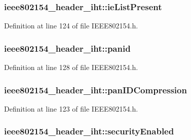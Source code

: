 \subsubsection[{\texorpdfstring{ie\+List\+Present}{ieListPresent}}]{ ieee802154\+\_\+header\+\_\+iht\+::ie\+List\+Present}\hypertarget{structieee802154__header__iht_a742bf0ac963d4dfef383f3874298572f}{}\label{structieee802154__header__iht_a742bf0ac963d4dfef383f3874298572f}


Definition at line 124 of file I\+E\+E\+E802154.\+h.

\subsubsection[{\texorpdfstring{panid}{panid}}]{ ieee802154\+\_\+header\+\_\+iht\+::panid}\hypertarget{structieee802154__header__iht_adb1dbee92649183063e5a8508b19fcb2}{}\label{structieee802154__header__iht_adb1dbee92649183063e5a8508b19fcb2}


Definition at line 128 of file I\+E\+E\+E802154.\+h.

\subsubsection[{\texorpdfstring{pan\+I\+D\+Compression}{panIDCompression}}]{ ieee802154\+\_\+header\+\_\+iht\+::pan\+I\+D\+Compression}\hypertarget{structieee802154__header__iht_a0e893eb7bc12f48410b7bfcdcfaf596c}{}\label{structieee802154__header__iht_a0e893eb7bc12f48410b7bfcdcfaf596c}


Definition at line 123 of file I\+E\+E\+E802154.\+h.

\subsubsection[{\texorpdfstring{security\+Enabled}{securityEnabled}}]{ ieee802154\+\_\+header\+\_\+iht\+::security\+Enabled}\hypertarget{structieee802154__header__iht_a10c1770138a2323bcaf37a6a0b6c7389}{}\label{structieee802154__header__iht_a10c1770138a2323bcaf37a6a0b6c7389}



